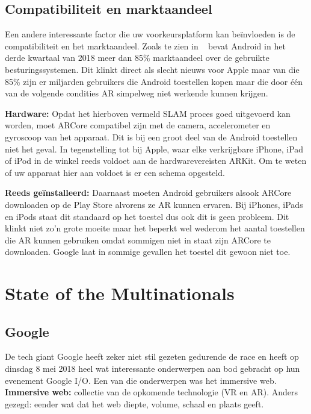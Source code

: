 \subsection{Compatibiliteit en marktaandeel}

Een andere interessante factor die uw voorkeursplatform kan beïnvloeden is de compatibiliteit en het marktaandeel. Zoals te zien in ~\textcite{IDC2018} bevat Android in het derde kwartaal van 2018 meer dan 85\% marktaandeel over de gebruikte besturingssystemen. Dit klinkt direct als slecht nieuws voor Apple maar van die 85\% zijn er miljarden gebruikers die Android toestellen kopen maar die door één van de volgende condities AR simpelweg niet werkende kunnen krijgen. 

\textbf{Hardware:}
Opdat het hierboven vermeld SLAM proces goed uitgevoerd kan worden, moet ARCore compatibel zijn met de camera, accelerometer en gyroscoop van het apparaat. Dit is bij een groot deel van de Android toestellen niet het geval. In tegenstelling tot bij Apple, waar elke verkrijgbare iPhone, iPad of iPod in de winkel reeds voldoet aan de hardwarevereisten ARKit. Om te weten of uw apparaat hier aan voldoet is er een schema opgesteld. ~\autocite{GoogleDevices2019}

\textbf{Reeds geïnstalleerd:}
Daarnaast moeten Android gebruikers alsook ARCore downloaden op de Play Store alvorens ze AR kunnen ervaren. Bij iPhones, iPads en iPods staat dit standaard op het toestel dus ook dit is geen probleem. Dit klinkt niet zo'n grote moeite maar het beperkt wel wederom het aantal toestellen die AR kunnen gebruiken omdat sommigen niet in staat zijn ARCore te downloaden. Google laat in sommige gevallen het toestel dit gewoon niet toe. 
 
\section{State of the Multinationals}
\label{sec:state-of-the-multinationals}
  

\subsection{Google}
De tech giant Google heeft zeker niet stil gezeten gedurende de race en heeft op dinsdag 8 mei 2018 heel wat interessante onderwerpen aan bod gebracht op hun evenement Google I/O. Een van die onderwerpen was het immersive web.
\textbf{Immersive web:} 
collectie van de opkomende technologie (VR en AR). Anders gezegd: eender wat dat het web diepte, volume, schaal en plaats geeft.

